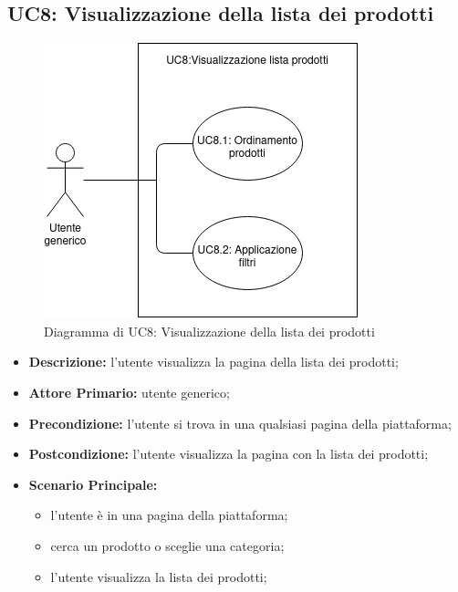 \subsection{UC8: Visualizzazione della lista dei prodotti}
\label{sec:UC8}
\begin{figure}[!ht]
    \caption{Diagramma di UC8: Visualizzazione della lista dei prodotti}
    \vspace{10px}
    \includegraphics[scale=0.5]{../../../Images/AnalisiRequisiti/UC08.png}
    \centering
\end{figure}
\begin{itemize}
    \item \textbf{Descrizione:} l'utente visualizza la pagina della lista dei prodotti;
    \item \textbf{Attore Primario:} utente generico;
    \item \textbf{Precondizione:} l'utente si trova in una qualsiasi pagina della piattaforma;
    \item \textbf{Postcondizione:} l'utente visualizza la pagina con la lista dei prodotti;
    \item \textbf{Scenario Principale:}
          \begin{itemize}
              \item l'utente è in una pagina della piattaforma;
              \item cerca un prodotto o sceglie una categoria;
              \item l'utente visualizza la lista dei prodotti;
          \end{itemize}
\end{itemize}
